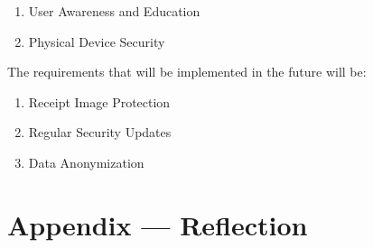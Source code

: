 \documentclass{article}
\begin{document}
\begin{enumerate}
	\item User Awareness and Education
	\item Physical Device Security
\end{enumerate}

\noindent The requirements that will be implemented in the future will be:

\begin{enumerate}
	\item Receipt Image Protection
	\item Regular Security Updates
	\item Data Anonymization
\end{enumerate}

\newpage{}

\section*{Appendix --- Reflection}


\end{document}
